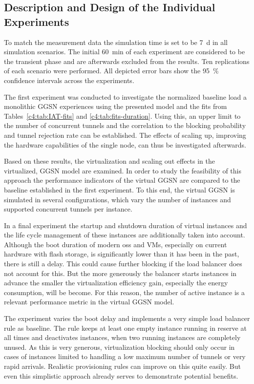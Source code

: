 \subsection{Description and Design of the Individual Experiments}

To match the measurement data the simulation time is set to be \SI{7}{\day} in all simulation scenarios. The initial \SI{60}{\minute} of each experiment are considered to be the transient phase and are afterwards excluded from the results. Ten replications of each scenario were performed. All depicted error bars show the \SI{95}{\percent} confidence intervals across the experiments.

The first experiment was conducted to investigate the normalized baseline load a monolithic \gls{GGSN} experiences using the presented model and the fits from Tables~\ref{c4:tab:IAT-fits} and \ref{c4:tab:fits-duration}. Using this, an upper limit to the number of concurrent tunnels and the correlation to the blocking probability and tunnel rejection rate can be established. The effects of scaling up, improving the hardware capabilities of the single node, can thus be investigated afterwards.

Based on these results, the virtualization and scaling out effects in the virtualized, \gls{GGSN} model are examined. In order to study the feasibility of this approach the performance indicators of the virtual \gls{GGSN} are compared to the baseline established in the first experiment. To this end, the virtual \gls{GGSN} is simulated in several configurations, which vary the number of instances and supported concurrent tunnels per instance.

In a final experiment the startup and shutdown duration of virtual instances and the life cycle management of these instances are additionally taken into account. Although the boot duration of modern \glspl{os} and \glspl{VM}, especially on current hardware with flash storage, is significantly lower than it has been in the past, there is still a delay. This could cause further blocking if the load balancer does not account for this. But the more generously the balancer starts instances in advance the smaller the virtualization efficiency gain, especially the energy consumption, will be become. For this reason, the number of active instance is a relevant performance metric in the virtual \gls{GGSN} model.

The experiment varies the boot delay and implements a very simple load balancer rule as baseline. The rule keeps at least one empty instance running in reserve at all times and deactivates instances, when two running instances are completely unused. As this is very generous, virtualization blocking should only occur in cases of instances limited to handling a low maximum number of tunnels or very rapid arrivals. Realistic provisioning rules can improve on this quite easily. But even this simplistic approach already serves to demonstrate potential benefits.


